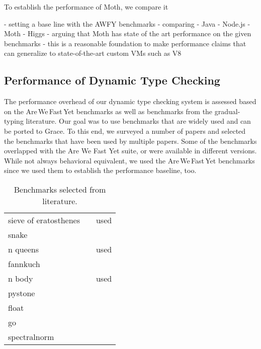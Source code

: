 To establish the performance of Moth,
we compare it 
\citep{Marr2016}

\begin{cnote}
- setting a base line with the AWFY benchmarks
- comparing
  - Java
  - Node.js
  - Moth
  - Higgs
- arguing that Moth has state of the art performance on the given benchmarks
- this is a reasonable foundation to make performance claims
  that can generalize to state-of-the-art custom VMs such as V8
\end{cnote}

\subsection{Performance of Dynamic Type Checking}

The performance overhead of our dynamic type checking system
is assessed based on the Are\,We\,Fast\,Yet benchmarks
as well as benchmarks from the gradual-typing literature.
Our goal was to use benchmarks that are widely used and can be ported to Grace.
To this end, we surveyed a number of papers\citep{Takikawa2016,Vitousek2017,Muehlboeck2017,Bauman2017,Richards2017,Stulova2016,Greenman2018}
and selected the benchmarks that have been used by multiple papers.
Some of the benchmarks overlapped with the Are We Fast Yet suite,
or were available in different versions.
While not always behavioral equivalent,
we used the Are\,We\,Fast\,Yet benchmarks since we used them to
establish the performance baseline, too.

\begin{table}
\caption{Benchmarks selected from literature.}
\label{tab:gradual-benchmarks}
\begin{tabular}{l l r}
sieve of eratosthenes &
 \cite{Takikawa2016,Muehlboeck2017,Bauman2017,Richards2017} & used \cite{Marr2016} \\
snake & \cite{Takikawa2016,Muehlboeck2017,Bauman2017,Richards2017} \\
n queens & \cite{Vitousek2017,Muehlboeck2017,Greenman2018} & used \cite{Marr2016} \\
fannkuch & \cite{Vitousek2017,Greenman2018} \\
n body & \cite{Kuhlenschmidt:2018:preprint,Vitousek2017,Greenman2018} & used \cite{Marr2016} \\
pystone & \cite{Vitousek2017,Muehlboeck2017,Greenman2018} \\
float & \cite{Vitousek2017,Muehlboeck2017,Greenman2018} \\
go & \cite{Vitousek2017,Muehlboeck2017,Greenman2018} \\
spectralnorm & \cite{Vitousek2017,Muehlboeck2017,Greenman2018}
\end{tabular}
\end{table}


